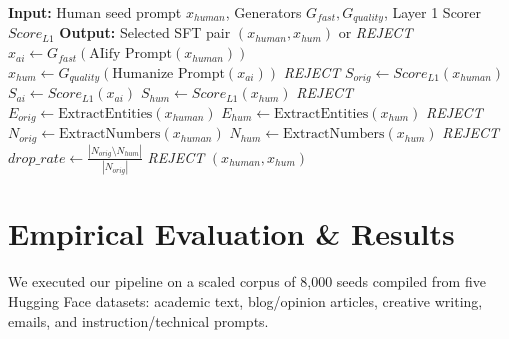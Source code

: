 \documentclass{article}
\begin{document}
\begin{algorithm}[htbp]
\caption{Two-Layer Scoring and Gating Pipeline}
\label{alg:gating}
\begin{algorithmic}[1]
\State \textbf{Input:} Human seed prompt $x_{human}$, Generators $G_{fast}, G_{quality}$, Layer 1 Scorer $Score_{L1}$
\State \textbf{Output:} Selected SFT pair $(x_{human}, x_{hum})$ or \textit{REJECT}
\State $x_{ai} \gets G_{fast}(\text{AIify Prompt}(x_{human}))$ 
\State $x_{hum} \gets G_{quality}(\text{Humanize Prompt}(x_{ai}))$ 
\Statex
\State {}
        \State \Return \textit{REJECT}
    \EndIf
\EndFor
\Statex
\State {}
\State $S_{orig} \gets Score_{L1}(x_{human})$
\State $S_{ai} \gets Score_{L1}(x_{ai})$
\State $S_{hum} \gets Score_{L1}(x_{hum})$
    \State \Return \textit{REJECT}
\EndIf
\Statex
\State {}
\State $E_{orig} \gets \text{ExtractEntities}(x_{human})$ 
\State $E_{hum} \gets \text{ExtractEntities}(x_{hum})$
    \State \Return \textit{REJECT} 
\EndIf
\State $N_{orig} \gets \text{ExtractNumbers}(x_{human})$
\State $N_{hum} \gets \text{ExtractNumbers}(x_{hum})$
     \State \Return \textit{REJECT} \EndIf
\Else
    \State $drop\_rate \gets \frac{|N_{orig} \setminus N_{hum}|}{|N_{orig}|}$
     \State \Return \textit{REJECT} 
    \EndIf
\EndIf
\State \Return $(x_{human}, x_{hum})$ 
\end{algorithmic}
\end{algorithm}

\section{Empirical Evaluation \& Results}
We executed our pipeline on a scaled corpus of 8,000 seeds compiled from five Hugging Face datasets: academic text, blog/opinion articles, creative writing, emails, and instruction/technical prompts.
\end{document}
